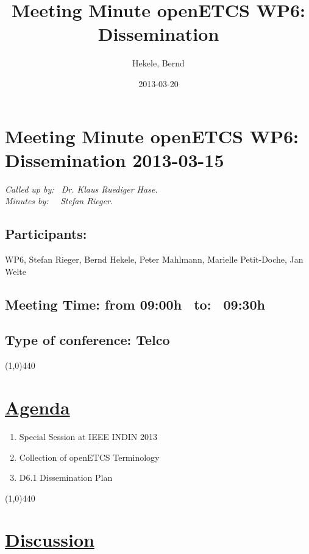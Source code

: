 \documentclass[a4paper]{article}
\title{Meeting Minute openETCS WP6: Dissemination}
\author{Hekele, Bernd}
\date{2013-03-20}
\begin{document}
\section*{\large{Meeting Minute openETCS WP6: Dissemination 2013-03-15}}

\emph{Called up by: \ Dr. Klaus Ruediger Hase.}\\
\emph{Minutes by: \ \  Stefan Rieger.}

\subsection*{Participants:} WP6, 
Stefan Rieger, 
Bernd Hekele,
Peter Mahlmann, 
Marielle Petit-Doche, 
Jan Welte\\


\subsection*{Meeting Time: from 09:00h \ to: \ 09:30h}

\subsection*{Type of conference: Telco}

\line(1,0){440}
\section*{\underline{Agenda}}
\begin{enumerate}
\item Special Session at IEEE INDIN 2013
\item Collection of openETCS Terminology
\item D6.1 Dissemination Plan
\end{enumerate}
\line(1,0){440}
\section*{\underline{Discussion}}
\end{document}
